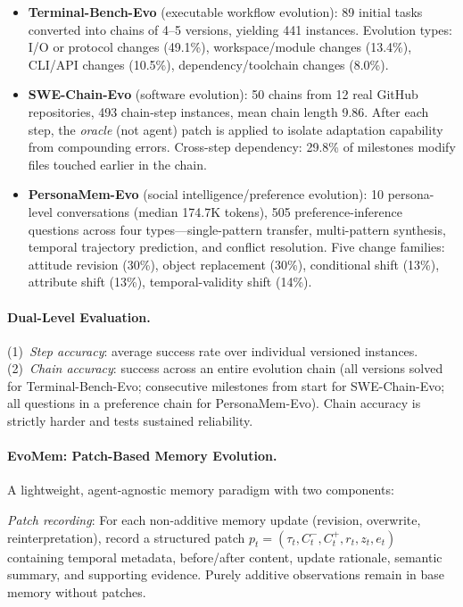 \documentclass[11pt,a4paper]{article}
\begin{document}
\begin{itemize}
\item \textbf{Terminal-Bench-Evo} (executable workflow evolution): 89 initial tasks converted into chains of 4--5 versions, yielding 441 instances. Evolution types: I/O or protocol changes (49.1\%), workspace/module changes (13.4\%), CLI/API changes (10.5\%), dependency/toolchain changes (8.0\%).
\item \textbf{SWE-Chain-Evo} (software evolution): 50 chains from 12 real GitHub repositories, 493 chain-step instances, mean chain length 9.86. After each step, the \emph{oracle} (not agent) patch is applied to isolate adaptation capability from compounding errors. Cross-step dependency: 29.8\% of milestones modify files touched earlier in the chain.
\item \textbf{PersonaMem-Evo} (social intelligence/preference evolution): 10 persona-level conversations (median 174.7K tokens), 505 preference-inference questions across four types---single-pattern transfer, multi-pattern synthesis, temporal trajectory prediction, and conflict resolution. Five change families: attitude revision (30\%), object replacement (30\%), conditional shift (13\%), attribute shift (13\%), temporal-validity shift (14\%).
\end{itemize}

\paragraph{Dual-Level Evaluation.} (1)~\emph{Step accuracy}: average success rate over individual versioned instances. (2)~\emph{Chain accuracy}: success across an entire evolution chain (all versions solved for Terminal-Bench-Evo; consecutive milestones from start for SWE-Chain-Evo; all questions in a preference chain for PersonaMem-Evo). Chain accuracy is strictly harder and tests sustained reliability.

\paragraph{EvoMem: Patch-Based Memory Evolution.} A lightweight, agent-agnostic memory paradigm with two components:

\emph{Patch recording}: For each non-additive memory update (revision, overwrite, reinterpretation), record a structured patch $p_t = (\tau_t, C_t^-, C_t^+, r_t, z_t, e_t)$ containing temporal metadata, before/after content, update rationale, semantic summary, and supporting evidence. Purely additive observations remain in base memory without patches.
\end{document}
